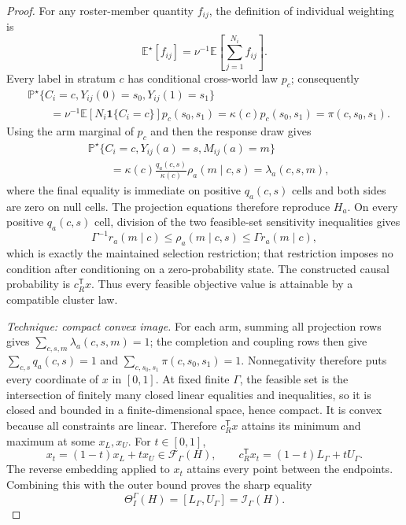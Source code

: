 \documentclass{article}
\begin{document}
\begin{proof}
For any roster-member quantity \(f_{ij}\), the definition of individual weighting is
\[
\mathbb E^{\star}[f_{ij}]
=\nu^{-1}\mathbb E\!\left[\sum_{j=1}^{N_i}f_{ij}\right].
\]
Every label in stratum \(c\) has conditional cross-world law \(p_c\); consequently
\[
\begin{aligned}
&\mathbb P^{\star}\{C_i=c,Y_{ij}(0)=s_0,Y_{ij}(1)=s_1\}\\
&\qquad=\nu^{-1}\mathbb E[N_i\mathbf 1\{C_i=c\}]p_c(s_0,s_1)
=\kappa(c)p_c(s_0,s_1)
=\pi(c,s_0,s_1).
\end{aligned}
\]
Using the arm marginal of \(p_c\) and then the response draw gives
\[
\begin{aligned}
&\mathbb P^{\star}\{C_i=c,Y_{ij}(a)=s,M_{ij}(a)=m\}\\
&\qquad=\kappa(c)\frac{q_a(c,s)}{\kappa(c)}\rho_a(m\mid c,s)
=\lambda_a(c,s,m),
\end{aligned}
\]
where the final equality is immediate on positive \(q_a(c,s)\) cells and both sides are zero on null cells.  The projection equations therefore reproduce \(H_a\).  On every positive \(q_a(c,s)\) cell, division of the two feasible-set sensitivity inequalities gives
\[
\Gamma^{-1}r_a(m\mid c)
\leq\rho_a(m\mid c,s)
\leq\Gamma r_a(m\mid c),
\]
which is exactly the maintained selection restriction; that restriction imposes no condition after conditioning on a zero-probability state.  The constructed causal probability is \(c_R^{\mathsf T}x\).  Thus every feasible objective value is attainable by a compatible cluster law.

\emph{Technique: compact convex image.}
For each arm, summing all projection rows gives \(\sum_{c,s,m}\lambda_a(c,s,m)=1\); the completion and coupling rows then give \(\sum_{c,s}q_a(c,s)=1\) and \(\sum_{c,s_0,s_1}\pi(c,s_0,s_1)=1\).  Nonnegativity therefore puts every coordinate of \(x\) in \([0,1]\).  At fixed finite \(\Gamma\), the feasible set is the intersection of finitely many closed linear equalities and inequalities, so it is closed and bounded in a finite-dimensional space, hence compact.  It is convex because all constraints are linear.  Therefore \(c_R^{\mathsf T}x\) attains its minimum and maximum at some \(x_L,x_U\).  For \(t\in[0,1]\),
\[
x_t=(1-t)x_L+t x_U\in\mathcal F_{\Gamma}(H),
\qquad
c_R^{\mathsf T}x_t=(1-t)L_{\Gamma}+tU_{\Gamma}.
\]
The reverse embedding applied to \(x_t\) attains every point between the endpoints.  Combining this with the outer bound proves the sharp equality
\[
\Theta_I^{\Gamma}(H)=[L_{\Gamma},U_{\Gamma}]=\mathcal I_{\Gamma}(H).
\]


\end{proof}
\end{document}

